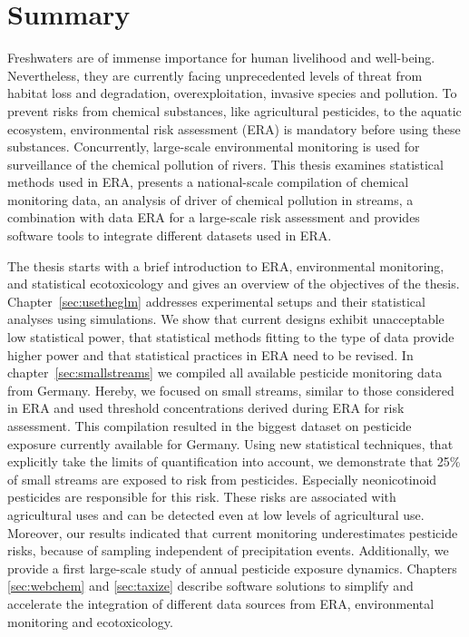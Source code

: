 



\thispagestyle{empty}
\begingroup
\let\clearpage\relax
\let\cleardoublepage\relax
\let\cleardoublepage\relax
\chapter*{Summary}
\thispagestyle{empty}

Freshwaters are of immense importance for human livelihood and well-being.
Nevertheless, they are currently facing unprecedented levels of threat from habitat loss and degradation, overexploitation, invasive species and
pollution. To prevent risks from chemical substances, like agricultural pesticides, to the aquatic ecosystem, environmental risk assessment (ERA) is mandatory before using these substances. Concurrently, large-scale environmental monitoring is used for surveillance of the chemical pollution of rivers. 
This thesis examines statistical methods used in ERA, presents a national-scale compilation of chemical monitoring data, an analysis of driver of chemical pollution in streams, a combination with data ERA for a large-scale risk assessment and provides software tools to integrate different datasets used in ERA.

The thesis starts with a brief introduction to ERA, environmental monitoring, and statistical ecotoxicology and gives an overview of the objectives of the thesis.
Chapter~\ref{sec:usetheglm} addresses experimental setups and their statistical analyses using simulations. We show that current designs exhibit unacceptable low statistical power, that statistical methods fitting to the type of data provide higher power and that statistical practices in ERA need to be revised.
In chapter~\ref{sec:smallstreams} we compiled all available pesticide monitoring data from Germany.
Hereby, we focused on small streams, similar to those considered in ERA and used threshold concentrations derived during ERA for risk assessment. 
This compilation resulted in the biggest dataset on pesticide exposure currently available for Germany.
Using new statistical techniques, that explicitly take the limits of quantification into account, we demonstrate that 25\% of small streams are exposed to risk from pesticides. 
Especially neonicotinoid pesticides are responsible for this risk.
These risks are associated with agricultural uses and can be detected even at low levels of agricultural use. Moreover, our results indicated that current monitoring underestimates pesticide risks, because of sampling independent of precipitation events.
Additionally, we provide a first large-scale study of annual pesticide exposure dynamics.
Chapters \ref{sec:webchem} and \ref{sec:taxize} describe software solutions to simplify and accelerate the integration of different data sources 
from ERA, environmental monitoring and ecotoxicology.

